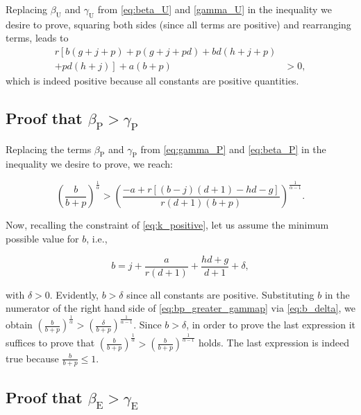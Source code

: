 \documentclass[twocolumn,english]{IEEEtran}
\theoremstyle{plain}
\theoremstyle{definition}
\begin{document}
\label{subsec:ff} Replacing $\beta_{\textrm{U}}$ and $\gamma_{\text{U}}$
from \eqref{eq:beta_U} and \eqref{gamma_U} in the inequality we
desire to prove, squaring both sides (since all terms are positive)
and rearranging terms, leads to 
\begin{align}
r\left[b\left(g+j+p\right)+p\left(g+j+pd\right)+bd\left(h+j+p\right)\right.\nonumber \\
\left.+pd\left(h+j\right)\right]+a\left(b+p\right) & >0,
\end{align}
which is indeed positive because all constants are positive quantities.


\subsection{Proof that $\beta_{\textrm{P}}>\gamma_{\textrm{P}}$ }

\label{subsec:ff2}Replacing the terms $\beta_{\textrm{P}}$ and $\gamma_{\textrm{P}}$
from \eqref{eq:gamma_P} and \eqref{eq:beta_P} in the inequality
we desire to prove, we reach:

\begin{equation}
\left(\frac{b}{b+p}\right)^{\frac{1}{\alpha}}>\left(\frac{-a+r\left[\left(b-j\right)\left(d+1\right)-hd-g\right]}{r\left(d+1\right)\left(b+p\right)}\right)^{\frac{1}{\alpha-1}}.\label{eq:bp_greater_gammap}
\end{equation}


\noindent Now, recalling the constraint of \eqref{eq:k_positive},
let us assume the minimum possible value for $b$, i.e.,

\begin{equation}
b=j+\frac{a}{r(d+1)}+\frac{hd+g}{d+1}+\delta,\label{eq:b_delta}
\end{equation}


\noindent with $\delta>0$. Evidently, $b>\delta$ since all constants
are positive. Substituting $b$ in the numerator of the right hand
side of \eqref{eq:bp_greater_gammap} via \eqref{eq:b_delta}, we
obtain $\left(\frac{b}{b+p}\right)^{\frac{1}{\alpha}}>\left(\frac{\delta}{b+p}\right)^{\frac{1}{\alpha-1}}$.
Since $b>\delta$, in order to prove the last expression it suffices
to prove that $\left(\frac{b}{b+p}\right)^{\frac{1}{\alpha}}>\left(\frac{b}{b+p}\right)^{\frac{1}{\alpha-1}}$
holds. The last expression is indeed true because $\frac{b}{b+p}\leq1$.


\subsection{Proof that $\beta_{\text{E}}>\gamma_{\textrm{E}}$ }
\end{document}
